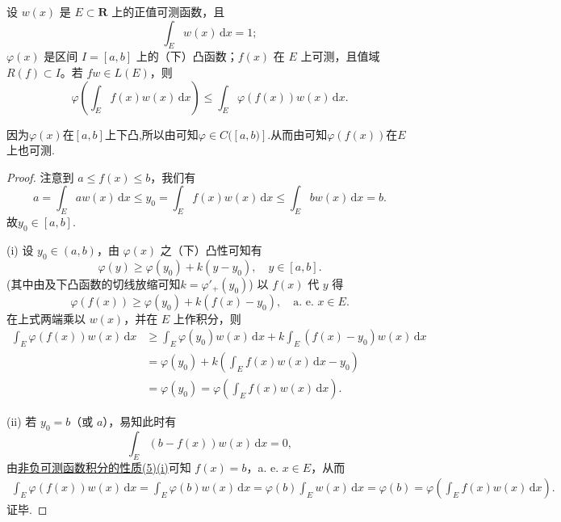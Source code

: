 \documentclass[../../main.tex]{subfiles}
\begin{document}
\begin{theorem}[Jensen不等式]\label{theorem:Jensen不等式}
设 $w(x)$ 是 $E \subset \mathbf{R}$ 上的正值可测函数，且
\[
\int_E w(x) \, \mathrm{d}x = 1;
\]
$\varphi(x)$ 是区间 $I = [a,b]$ 上的（下）凸函数；$f(x)$ 在 $E$ 上可测，且值域 $R(f) \subset I$。若 $fw \in L(E)$，则
\[
\varphi\left( \int_E f(x)w(x) \, \mathrm{d}x \right) \leqslant \int_E \varphi(f(x))w(x) \, \mathrm{d}x.
\]
\end{theorem}
\begin{remark}
因为$\varphi(x)$在$[a,b]$上下凸,所以由可知$\varphi \in C([a,b)]$.从而由可知$\varphi(f(x))$在$E$上也可测.
\end{remark}
\begin{proof}
注意到 $a \leqslant f(x) \leqslant b$，我们有
\[
a=\int_E{aw(x)\,\mathrm{d}x}\leqslant y_0=\int_E{f(x)w(x)\,\mathrm{d}x}\leqslant \int_E{bw(x)\,\mathrm{d}x}=b.
\]
故$y_0\in[a,b]$.

(i) 设 $y_0 \in (a,b)$，由 $\varphi(x)$ 之（下）凸性可知有
\[
\varphi(y) \geqslant \varphi(y_0) + k(y - y_0), \quad y \in [a,b].
\]
(其中由及下凸函数的切线放缩可知$k=\varphi'_+(y_0)$)
以 $f(x)$ 代 $y$ 得
\[
\varphi(f(x)) \geqslant \varphi(y_0) + k(f(x) - y_0), \quad \text{a. e. } x \in E.
\]
在上式两端乘以 $w(x)$，并在 $E$ 上作积分，则
\begin{align*}
\int_E \varphi(f(x))w(x) \, \mathrm{d}x &\geqslant \int_E \varphi(y_0)w(x) \, \mathrm{d}x + k \int_E (f(x) - y_0)w(x) \, \mathrm{d}x \\
&= \varphi(y_0) + k \left( \int_E f(x)w(x) \, \mathrm{d}x - y_0 \right) \\
&= \varphi(y_0) = \varphi\left( \int_E f(x)w(x) \, \mathrm{d}x \right).
\end{align*}

(ii) 若 $y_0 = b$（或 $a$），易知此时有
\[
\int_E (b - f(x))w(x) \, \mathrm{d}x = 0,
\]
由\hyperref[theorem:非负可测函数积分的性质]{非负可测函数积分的性质(5)(i)}可知 $f(x) = b$，a. e. $x \in E$，从而
\begin{align*}
\int_E \varphi(f(x))w(x) \, \mathrm{d}x = \int_E \varphi(b)w(x) \, \mathrm{d}x 
= \varphi(b) \int_E w(x) \, \mathrm{d}x = \varphi(b) 
= \varphi\left( \int_E f(x)w(x) \, \mathrm{d}x \right).
\end{align*}
证毕.

\end{proof}
\end{document}
